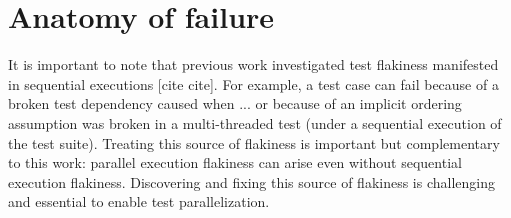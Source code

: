 \section{Anatomy of \pef{} failure}


It is important to note that previous work investigated test flakiness
manifested in sequential executions [cite cite].  For example, a test
case can fail because of a broken test dependency caused when ... or
because of an implicit ordering assumption was broken in a
multi-threaded test (under a sequential execution of the test suite).
Treating this source of flakiness is important but complementary to
this work: parallel execution flakiness can arise even without
sequential execution flakiness.  Discovering and fixing this source of
flakiness is challenging and essential to enable test parallelization.



